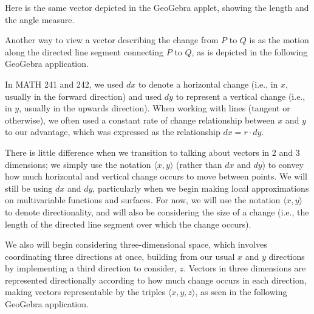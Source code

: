 \documentclass{ximera}
\begin{document}
Here is the same vector depicted in the GeoGebra applet, showing the length and the angle measure. 

\begin{center}
\end{center}

Another way to view a vector describing the change from $P$ to $Q$ is as the motion along the directed line segment connecting $P$ to $Q$, as is depicted in the following GeoGebra application.

\begin{center}
\end{center}

In MATH 241 and 242, we used $dx$ to denote a horizontal change (i.e., in $x$, usually in the forward direction) and used $dy$ to represent a vertical change (i.e., in $y$, usually in the upwards direction). When working with lines (tangent or otherwise), we often used a constant rate of change relationship between $x$ and $y$ to our advantage, which was expressed as the relationship $dx=r\cdot dy$.

There is little difference when we transition to talking about vectors in 2 and 3 dimensions; we simply use the notation $\langle x,y\rangle$ (rather than $dx$ and $dy$) to convey how much horizontal and vertical change occurs to move between points. We will still be using $dx$ and $dy$, particularly when we begin making local approximations on multivariable functions and surfaces. For now, we will use the notation $\langle x,y\rangle$ to denote directionality, and will also be considering the size of a change (i.e., the length of the directed line segment over which the change occurs).

We also will begin considering three-dimensional space, which involves coordinating three directions at once, building from our usual $x$ and $y$ directions by implementing a third direction to consider, $z$. Vectors in three dimensions are represented directionally according to how much change occurs in each direction, making vectors representable by the triples $\langle x,y,z\rangle$, as seen in the following GeoGebra application.

\begin{center}
\end{center}
\end{document}
